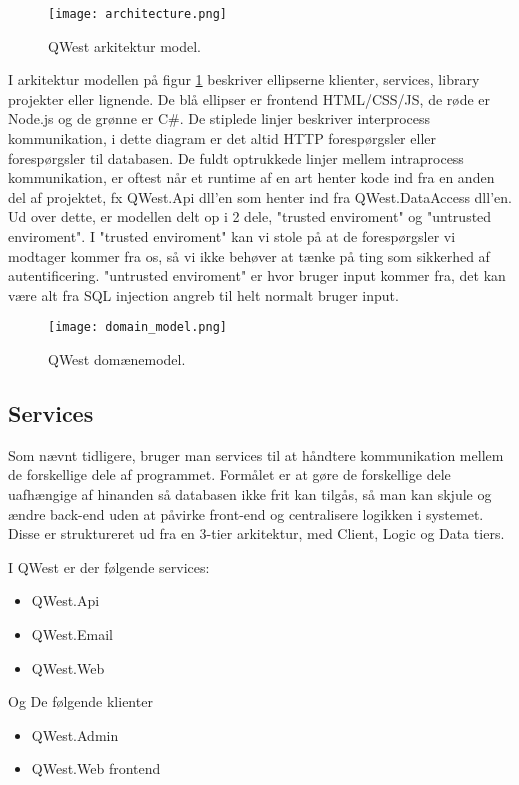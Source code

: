 \begin{figure}[H]
    \texttt{[image: architecture.png]}
    \caption{QWest arkitektur model.}
    \label{fig:architecture_model}
\end{figure}

I arkitektur modellen på figur \ref{fig:architecture_model} beskriver ellipserne klienter, services, library projekter eller lignende. De blå ellipser er frontend HTML/CSS/JS, de røde er Node.js\cite{nodejs} og de grønne er C\#.
De stiplede linjer beskriver interprocess kommunikation, i dette diagram er det altid HTTP forespørgsler eller forespørgsler til databasen.
De fuldt optrukkede linjer mellem intraprocess kommunikation, er oftest når et runtime af en art henter kode ind fra en anden del af projektet, fx QWest.Api dll'en som henter ind fra QWest.DataAccess dll'en.
Ud over dette, er modellen delt op i 2 dele, "trusted enviroment" og "untrusted enviroment". I "trusted enviroment" kan vi stole på at de forespørgsler vi modtager kommer fra os, så vi ikke behøver at tænke på ting som sikkerhed af autentificering. "untrusted enviroment" er hvor bruger input kommer fra, det kan være alt fra SQL injection angreb til helt normalt bruger input.

\begin{figure}[H]
    \texttt{[image: domain\_model.png]}
    \caption{QWest domænemodel.}
    \label{fig:domain_model}
\end{figure}

\subsection{Services}\label{sec:servicesArc}
Som nævnt tidligere, bruger man services til at håndtere kommunikation mellem de forskellige dele af programmet. Formålet er at gøre de forskellige dele uafhængige af hinanden så databasen ikke frit kan tilgås, så man kan skjule og ændre back-end uden at påvirke front-end og centralisere logikken i systemet. Disse er struktureret ud fra en 3-tier arkitektur\cite{3tier}, med Client, Logic og Data tiers.

I QWest er der følgende services:
\begin{itemize}\label{items:services}
    \item QWest.Api
    \item QWest.Email
    \item QWest.Web
\end{itemize}

Og De følgende klienter
\begin{itemize}\label{items:clients}
    \item QWest.Admin
    \item QWest.Web frontend
\end{itemize}

